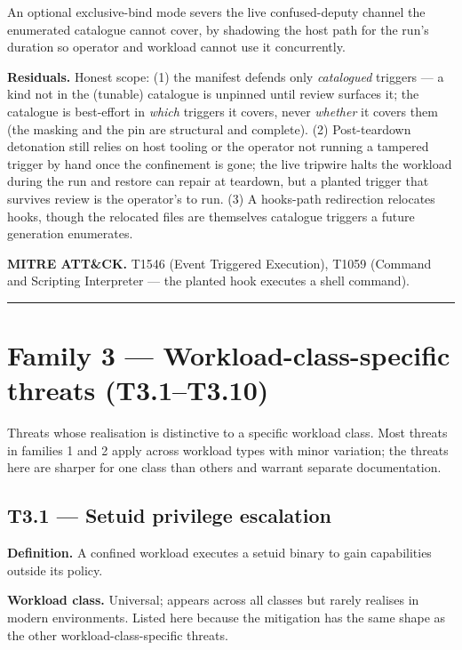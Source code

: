An optional exclusive-bind mode severs the live confused-deputy channel
the enumerated catalogue cannot cover, by shadowing the host path for
the run's duration so operator and workload cannot use it concurrently.

\textbf{Residuals.} Honest scope: (1) the manifest defends only
\emph{catalogued} triggers --- a kind not in the (tunable) catalogue is
unpinned until review surfaces it; the catalogue is best-effort in
\emph{which} triggers it covers, never \emph{whether} it covers them
(the masking and the pin are structural and complete). (2) Post-teardown
detonation still relies on host tooling or the operator not running a
tampered trigger by hand once the confinement is gone; the live tripwire
halts the workload during the run and restore can repair at teardown,
but a planted trigger that survives review is the operator's to run. (3)
A hooks-path redirection relocates hooks, though the relocated files are
themselves catalogue triggers a future generation enumerates.

\textbf{MITRE ATT\&CK.} T1546 (Event Triggered Execution), T1059
(Command and Scripting Interpreter --- the planted hook executes a shell
command).

\begin{center}\rule{0.5\linewidth}{0.5pt}\end{center}

\hypertarget{family-3-workload-class-specific-threats-t3.1t3.10}{%
\chapter{Family 3 --- Workload-class-specific threats
(T3.1--T3.10)}\label{family-3-workload-class-specific-threats-t3.1t3.10}}

Threats whose realisation is distinctive to a specific workload class.
Most threats in families 1 and 2 apply across workload types with minor
variation; the threats here are sharper for one class than others and
warrant separate documentation.

\hypertarget{t3.1-setuid-privilege-escalation}{%
\section{T3.1 --- Setuid privilege
escalation}\label{t3.1-setuid-privilege-escalation}}

\textbf{Definition.} A confined workload executes a setuid binary to
gain capabilities outside its policy.

\textbf{Workload class.} Universal; appears across all classes but
rarely realises in modern environments. Listed here because the
mitigation has the same shape as the other workload-class-specific
threats.

